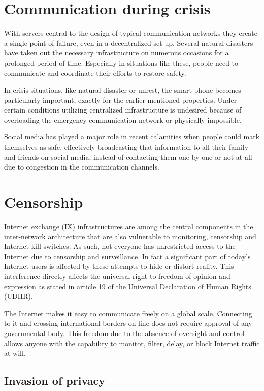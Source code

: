 \section{Communication during crisis}
With servers central to the design of typical communication networks they create a single point of failure, even in a decentralized set-up.
Several natural disasters have taken out the necessary infrastructure on numerous occasions for a prolonged period of time.
Especially in situations like these, people need to communicate and coordinate their efforts to restore safety.

In crisis situations, like natural disaster or unrest, the smart-phone becomes particularly important, exactly for the earlier mentioned properties.
Under certain conditions utilizing centralized infrastructure is undesired because of overloading the emergency communication network or physically impossible.

Social media has played a major role in recent calamities when people could mark themselves as safe, effectively broadcasting that information to all their family and friends on social media, instead of contacting them one by one or not at all due to congestion in the communication channels.


\section{Censorship}
Internet exchange (IX) infrastructures are among the central components in the inter-network architecture that are also vulnerable to monitoring, censorship and Internet kill-switches.
As such, not everyone has unrestricted access to the Internet due to censorship and surveillance.
In fact a significant part of today's Internet users is affected by these attempts to hide or distort reality. %
This interference directly affects the universal right to freedom of opinion and expression as stated in article 19 of the Universal Declaration of Human Rights (UDHR).

The Internet makes it easy to communicate freely on a global scale.
Connecting to it and crossing international borders on-line does not require approval of any governmental body. %
This freedom due to the absence of oversight and control allows anyone with the capability to monitor, filter, delay, or block Internet traffic at will.


\subsection{Invasion of privacy}

